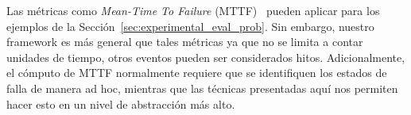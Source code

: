 Las métricas como \emph{Mean-Time To Failure} (MTTF)~\cite{ReliabilityBook}  pueden aplicar para los ejemplos de la Sección~\ref{sec:experimental_eval_prob}.
Sin embargo, nuestro framework es más general que tales métricas ya que no se limita a contar unidades de tiempo, otros eventos pueden ser considerados hitos.  Adicionalmente, el cómputo de MTTF normalmente requiere que se identifiquen los estados de falla de manera ad hoc, mientras que las técnicas presentadas aquí nos permiten hacer esto en un nivel de abstracción más alto.




 
		








